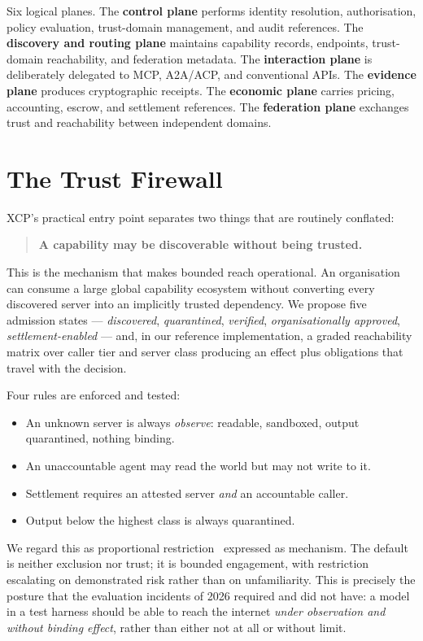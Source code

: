 \documentclass[11pt]{article}
\begin{document}
Six logical planes. The \textbf{control plane} performs identity resolution,
authorisation, policy evaluation, trust-domain management, and audit references.
The \textbf{discovery and routing plane} maintains capability records, endpoints,
trust-domain reachability, and federation metadata. The \textbf{interaction
plane} is deliberately delegated to MCP, A2A/ACP, and conventional APIs. The
\textbf{evidence plane} produces cryptographic receipts. The \textbf{economic
plane} carries pricing, accounting, escrow, and settlement references. The
\textbf{federation plane} exchanges trust and reachability between independent
domains.

\section{The Trust Firewall}

XCP's practical entry point separates two things that are routinely conflated:

\begin{quote}
\textbf{A capability may be discoverable without being trusted.}
\end{quote}

This is the mechanism that makes bounded reach operational. An organisation can
consume a large global capability ecosystem without converting every discovered
server into an implicitly trusted dependency. We propose five admission states
--- \emph{discovered}, \emph{quarantined}, \emph{verified}, \emph{organisationally
approved}, \emph{settlement-enabled} --- and, in our reference implementation, a
graded reachability matrix over caller tier and server class producing an effect
plus obligations that travel with the decision.

Four rules are enforced and tested:

\begin{itemize}[leftmargin=1.4em,itemsep=0.1em]
\item An unknown server is always \emph{observe}: readable, sandboxed, output
      quarantined, nothing binding.
\item An unaccountable agent may read the world but may not write to it.
\item Settlement requires an attested server \emph{and} an accountable caller.
\item Output below the highest class is always quarantined.
\end{itemize}

We regard this as proportional restriction~\cite{pattison2026} expressed as
mechanism. The default is neither exclusion nor trust; it is bounded engagement,
with restriction escalating on demonstrated risk rather than on unfamiliarity.
This is precisely the posture that the evaluation incidents of 2026 required and
did not have: a model in a test harness should be able to reach the internet
\emph{under observation and without binding effect}, rather than either not at
all or without limit.
\end{document}
